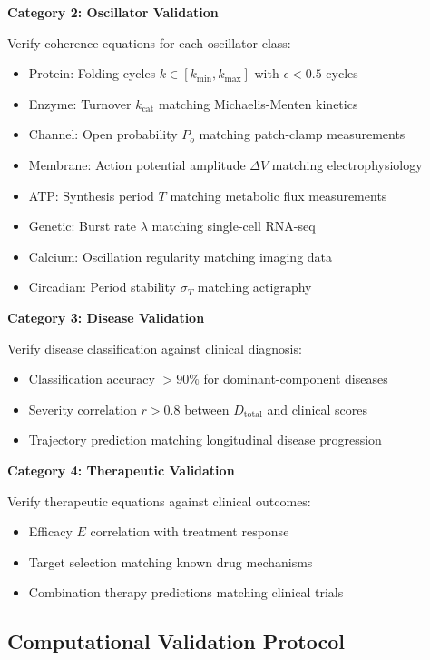 \documentclass[10pt,twocolumn]{article}
\theoremstyle{plain}
\theoremstyle{definition}
\theoremstyle{remark}
\begin{document}
\textbf{Category 2: Oscillator Validation}

Verify coherence equations for each oscillator class:
\begin{itemize}
\item Protein: Folding cycles $k \in [k_{\min}, k_{\max}]$ with $\epsilon < 0.5$ cycles
\item Enzyme: Turnover $k_{\mathrm{cat}}$ matching Michaelis-Menten kinetics
\item Channel: Open probability $P_o$ matching patch-clamp measurements
\item Membrane: Action potential amplitude $\Delta V$ matching electrophysiology
\item ATP: Synthesis period $T$ matching metabolic flux measurements
\item Genetic: Burst rate $\lambda$ matching single-cell RNA-seq
\item Calcium: Oscillation regularity matching imaging data
\item Circadian: Period stability $\sigma_T$ matching actigraphy
\end{itemize}

\textbf{Category 3: Disease Validation}

Verify disease classification against clinical diagnosis:
\begin{itemize}
\item Classification accuracy $> 90\%$ for dominant-component diseases
\item Severity correlation $r > 0.8$ between $D_{\mathrm{total}}$ and clinical scores
\item Trajectory prediction matching longitudinal disease progression
\end{itemize}

\textbf{Category 4: Therapeutic Validation}

Verify therapeutic equations against clinical outcomes:
\begin{itemize}
\item Efficacy $E$ correlation with treatment response
\item Target selection matching known drug mechanisms
\item Combination therapy predictions matching clinical trials
\end{itemize}

\subsection{Computational Validation Protocol}
\end{document}
